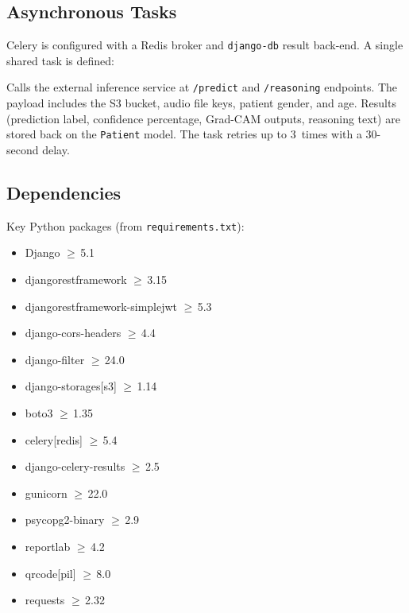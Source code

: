 \documentclass[12pt,a4paper]{article}
\begin{document}
\subsection{Asynchronous Tasks}
\label{sec:celery}

Celery is configured with a Redis broker and \texttt{django-db} result
back-end. A single shared task is defined:

\begin{description}[nosep]
  \item[\texttt{run\_inference\_task(patient\_id, phase)}] Calls the external
    inference service at \texttt{/predict} and \texttt{/reasoning} endpoints.
    The payload includes the S3 bucket, audio file keys, patient gender, and
    age. Results (prediction label, confidence percentage, Grad-CAM outputs,
    reasoning text) are stored back on the \texttt{Patient} model. The task
    retries up to 3~times with a 30-second delay.
\end{description}

\subsection{Dependencies}

Key Python packages (from \texttt{requirements.txt}):

\noindent
\begin{minipage}[t]{0.48\textwidth}
\begin{itemize}[nosep]
  \item Django $\geq$\,5.1
  \item djangorestframework $\geq$\,3.15
  \item djangorestframework-simplejwt $\geq$\,5.3
  \item django-cors-headers $\geq$\,4.4
  \item django-filter $\geq$\,24.0
  \item django-storages[s3] $\geq$\,1.14
  \item boto3 $\geq$\,1.35
\end{itemize}
\end{minipage}%
\hfill
\begin{minipage}[t]{0.48\textwidth}
\begin{itemize}[nosep]
  \item celery[redis] $\geq$\,5.4
  \item django-celery-results $\geq$\,2.5
  \item gunicorn $\geq$\,22.0
  \item psycopg2-binary $\geq$\,2.9
  \item reportlab $\geq$\,4.2
  \item qrcode[pil] $\geq$\,8.0
  \item requests $\geq$\,2.32
\end{itemize}
\end{minipage}
\end{document}
